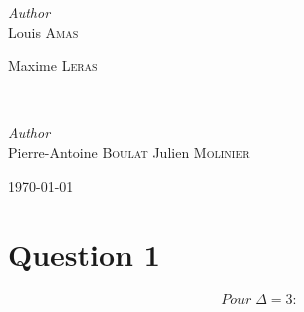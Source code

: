 \documentclass[11pt]{article}
\begin{document}
\begin{titlepage}
	
	\begin{minipage}{0.4\textwidth}
		\begin{flushleft}
			\large
			\textit{Author}\\
			Louis \textsc{Amas} %

			Maxime \textsc{Leras} %
		\end{flushleft}
	\end{minipage}
	~
	\begin{minipage}{0.4\textwidth}
		\begin{flushright}
			\large
			\textit{Author}\\
			Pierre-Antoine \textsc{Boulat} %
			Julien \textsc{Molinier} %
		\end{flushright}
	\end{minipage}
	
	
	
	
	\vfill\vfill\vfill\vfill %
	
	{\large\today} %

	 
	
	\vfill %
	
\end{titlepage}


\newpage

\section{Question 1}
\paragraph{}
\begin{equation}
	Pour \; \Delta = 3 : 
\end{equation}
\end{document}
